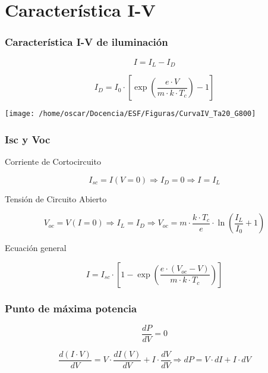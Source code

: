 \documentclass[xcolor=dvipsnames]{beamer}
\begin{document}
\section{Característica I-V}


\begin{frame}[plain]
  \frametitle{Característica I-V de iluminación}

\[
I=I_{L}-I_{D}\]


\[
I_{D}=I_{0}\cdot\left[\exp\left(\frac{e\cdot V}{m\cdot k\cdot
      T_{c}}\right)-1\right]\]


\begin{center}
  \texttt{[image: /home/oscar/Docencia/ESF/Figuras/CurvaIV\_Ta20\_G800]}
  \par\end{center}


\end{frame}

\begin{frame}
  \frametitle{Isc y Voc}
  \begin{block} {Corriente de Cortocircuito}

\[
I_{sc}=I(V=0)\Rightarrow I_{D}=0\Rightarrow I=I_{L}\]


\end{block} {}
\begin{block} {Tensión de Circuito Abierto}

\[
V_{oc}=V(I=0)\Rightarrow I_{L}=I_{D}\Rightarrow
V_{oc}=m\cdot\frac{k\cdot
  T_{c}}{e}\cdot\ln\left(\frac{I_{L}}{I_{0}}+1\right)\]


\end{block} {}
\begin{block} {Ecuación general}

\[
I=I_{sc}\cdot\left[1-\exp\left(\frac{e\cdot(V_{oc}-V)}{m\cdot k\cdot
      T_{c}}\right)\right]\]


\end{block} {}


\end{frame}

\begin{frame}
  \frametitle{Punto de máxima potencia}

\[
\frac{dP}{dV}=0\]


\[
\frac{d(I\cdot
  V)}{dV}=V\cdot\frac{dI(V)}{dV}+I\cdot\frac{dV}{dV}\Rightarrow
dP=V\cdot dI+I\cdot dV\]



\end{frame}
\end{document}

